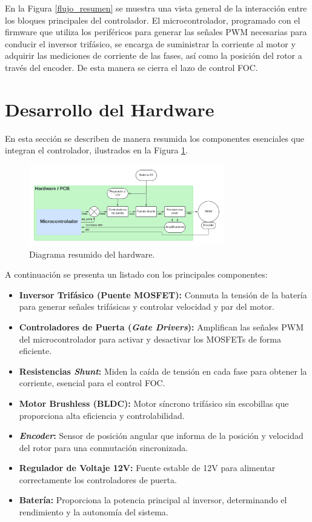\documentclass[11pt]{report}
\begin{document}
En la Figura \ref{flujo_resumen} se muestra una vista general de la interacción entre los bloques principales del controlador. El microcontrolador, programado con el firmware que utiliza los periféricos para generar las señales PWM necesarias para conducir el inversor trifásico, se encarga de suministrar la corriente al motor y adquirir las mediciones de corriente de las fases, así como la posición del rotor a través del encoder. De esta manera se cierra el lazo de control FOC.

\newpage
\section{Desarrollo del Hardware}

En esta sección se describen de manera resumida los componentes esenciales que integran el controlador, ilustrados en la Figura \ref{flujo_resumen_hardware}.

\begin{figure}[ht]
	\centering
	\includegraphics[width=0.76\textwidth]{imagenes/Diagramas/Diagramas - resumen hardware.png}
	\caption{Diagrama resumido del hardware.}
	\label{flujo_resumen_hardware}
\end{figure}

A continuación se presenta un listado con los principales componentes:

\begin{itemize}
    \item \textbf{Inversor Trifásico (Puente MOSFET):} Conmuta la tensión de la batería para generar señales trifásicas y controlar velocidad y par del motor.
    \item \textbf{Controladores de Puerta (\emph{Gate Drivers}):} Amplifican las señales PWM del microcontrolador para activar y desactivar los MOSFETs de forma eficiente.
    \item \textbf{Resistencias \emph{Shunt}:} Miden la caída de tensión en cada fase para obtener la corriente, esencial para el control FOC.
    \item \textbf{Motor Brushless (BLDC):} Motor síncrono trifásico sin escobillas que proporciona alta eficiencia y controlabilidad.
    \item \textbf{\emph{Encoder}:} Sensor de posición angular que informa de la posición y velocidad del rotor para una conmutación sincronizada.
    \item \textbf{Regulador de Voltaje 12V:} Fuente estable de 12V para alimentar correctamente los controladores de puerta.
    \item \textbf{Batería:} Proporciona la potencia principal al inversor, determinando el rendimiento y la autonomía del sistema.
\end{itemize}
\end{document}
